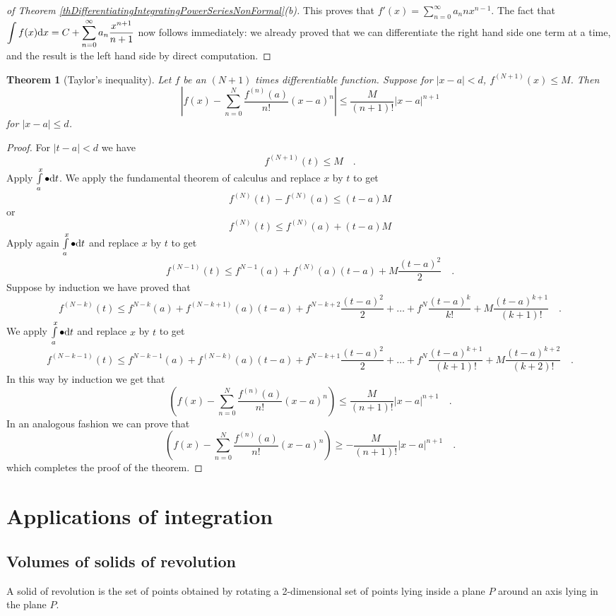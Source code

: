 \documentclass[12pt]{book}
\newtheorem{theorem}{Theorem}[section]
\begin{document}
\begin{proof}[ of Theorem \ref{thDifferentiatingIntegratingPowerSeriesNonFormal}(b)]
This proves that $f'(x)=\sum\limits_{n=0}^\infty a_n n x^{n-1}$. The fact that $\displaystyle\int f(x){\normalfont \text{d}} x= C+\sum\limits_{n=0}^\infty a_n\frac{x^{n+1}}{n+1} $ now follows immediately: we already proved that we can differentiate the right hand side one term at a time, and the result is the left hand side by direct computation.
\end{proof}

\begin{theorem}[Taylor's inequality] Let $f$ be an $(N+1)$ times differentiable function. Suppose for $|x-a|<d$, $f^{(N+1)}(x)\leq M$. Then
\[
\left|f(x)-\sum\limits_{n=0}^N \frac{f^{(n)}(a)}{n!}(x-a)^n\right| \leq \frac{M}{(n+1)!} |x-a|^{n+1}
\]
for $|x-a|\leq d$.
\end{theorem}
\begin{proof}
For $|t-a|< d$ we have
\[
f^{(N+1)}(t) \leq  M\quad.
\]
Apply $\int\limits_{a}^{x} \bullet {\normalfont \text{d}} t $. We apply the fundamental theorem of calculus and replace $x$ by $t$ to get
\[
f^{(N)}(t)-f^{(N)}(a)\leq (t-a) M
\]
or
\[
f^{(N)}(t)\leq f^{(N)}(a)+(t-a) M
\]
Apply again $\int\limits_{a}^{x} \bullet {\normalfont \text{d}} t $ and replace $x$ by $t$ to get
\[
f^{(N-1)}(t)\leq f^{N-1}(a) +f^{(N)}(a)(t-a)+ M\frac{(t-a)^2}2\quad .
\]
Suppose by induction we have proved that
\[
f^{(N-k)}(t)\leq f^{N-k}(a) +f^{(N-k+1)}(a)(t-a)+ f^{N-k+2}\frac{(t-a)^2}2+\dots +f^{N}\frac{(t-a)^{k}}{k!}+ M\frac{(t-a)^{k+1}}{(k+1)!} \quad .
\]
We apply $\int\limits_{a}^{x} \bullet {\normalfont \text{d}} t $ and replace $x$ by $t$ to get
\[
f^{(N-k-1)}(t)\leq f^{N-k-1}(a) +f^{(N-k)}(a)(t-a)+ f^{N-k+1}\frac{(t-a)^2}2+\dots +f^{N}\frac{(t-a)^{k+1}}{(k+1)!}+ M\frac{(t-a)^{k+2}}{(k+2)!} \quad .
\]
In this way by induction we get that
\[
\left(f(x)-\sum\limits_{n=0}^N \frac{f^{(n)}(a)}{n!}(x-a)^n\right)\leq \frac{M}{(n+1)!} |x-a|^{n+1} \quad.
\]
In an analogous fashion we can prove that
\[
\left(f(x)-\sum\limits_{n=0}^N \frac{f^{(n)}(a)}{n!}(x-a)^n\right)\geq -\frac{M}{(n+1)!} |x-a|^{n+1} \quad.
\]
which completes the proof of the theorem.
\end{proof}



\chapter{Applications of integration}
\section{Volumes of solids of revolution}
A solid of revolution is the set of points obtained by rotating a 2-dimensional set of points lying inside a plane $P$ around an axis lying in the plane $P$.
\end{document}
